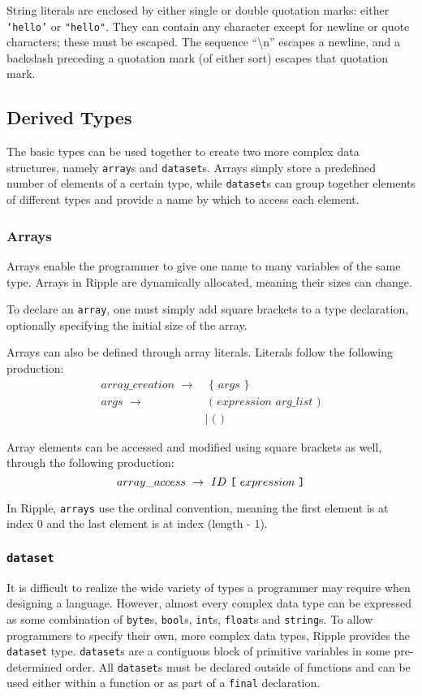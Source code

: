 \documentclass{article}
\newcommand{\code}{\texttt}
\begin{document}
String literals are enclosed by either single or double quotation marks: either \code{`hello'} or \code{"hello"}. They can contain any character except for newline or quote characters; these must be escaped. The sequence ``\textbackslash n'' escapes a newline, and a backslash preceding a quotation mark (of either sort) escapes that quotation mark.

\subsection{Derived Types}
The basic types can be used together to create two more complex data structures, namely \code{array}s and \code{dataset}s. Arrays simply store a predefined number of elements of a certain type, while \code{dataset}s can group together elements of different types and provide a name by which to access each element.

\subsubsection{Arrays}
Arrays enable the programmer to give one name to many variables of the same type. Arrays in Ripple are dynamically allocated, meaning their sizes can change.

To declare an \code{array}, one must simply add square brackets to a type declaration, optionally specifying the initial size of the array.

Arrays can also be defined through array literals. Literals follow the following production:
\begin{align*}
array\_creation\,\,\rightarrow&  \,\,\code{\{}\,\,args\,\,\code{\}}                  \\
args\,\,\rightarrow           &  \,\,\code{(}\,\,expression\,\,arg\_list\,\,\code{)} \\
                              &| \,\,\code{(}\,\,\code{)}
\end{align*}

Array elements can be accessed and modified using square brackets as well, through the following production:
\[ array\_access\,\,\rightarrow\,\,ID\,\,\code{\lbrack}\,\,expression\,\,\code{\rbrack} \]

In Ripple, \code{arrays} use the ordinal convention, meaning the first element is at index 0 and the last element is at index (length - 1).

\subsubsection{\code{dataset}}
It is difficult to realize the wide variety of types a programmer may require when designing a language. However, almost every complex data type can be expressed as some combination of \code{byte}s, \code{bool}s, \code{int}s, \code{float}s and \code{string}s. To allow programmers to specify their own, more complex data types, Ripple provides the \code{dataset} type. \code{dataset}s are a contiguous block of primitive variables in some pre-determined order. All \code{dataset}s must be declared outside of functions and can be used either within a function or as part of a \code{final} declaration. 
\end{document}
